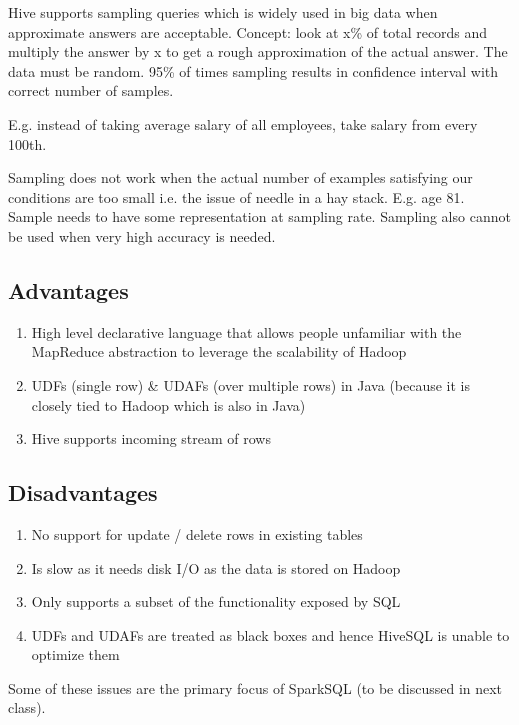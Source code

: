 \documentclass[twoside]{article}
\begin{document}
Hive supports sampling queries which is widely used in big data when approximate answers are acceptable. Concept: look at x\% of total records and multiply the answer by x to get a rough approximation of the actual answer. The data must be random. 95\% of times sampling results in confidence interval with correct number of samples.

E.g. instead of taking average salary of all employees, take salary from every 100th.

Sampling does not work when the actual number of examples satisfying our conditions are too small i.e. the issue of needle in a hay stack. E.g. age 81. Sample needs to have some representation at sampling rate. Sampling also cannot be used when very high accuracy is needed.

\subsection{Advantages}

\begin{enumerate}
    \item High level declarative language that allows people unfamiliar with the MapReduce abstraction to leverage the scalability of Hadoop
    \item UDFs (single row) \& UDAFs (over multiple rows) in Java (because it is closely tied to Hadoop which is also in Java)
    \item Hive supports incoming stream of rows 
\end{enumerate}

\subsection{Disadvantages}

\begin{enumerate}
    \item No support for update / delete rows in existing tables
    \item Is slow as it needs disk I/O as the data is stored on Hadoop
    \item Only supports a subset of the functionality exposed by SQL
    \item UDFs and UDAFs are treated as black boxes and hence HiveSQL is unable to optimize them
\end{enumerate}

Some of these issues are the primary focus of SparkSQL (to be discussed in next class).
\end{document}
